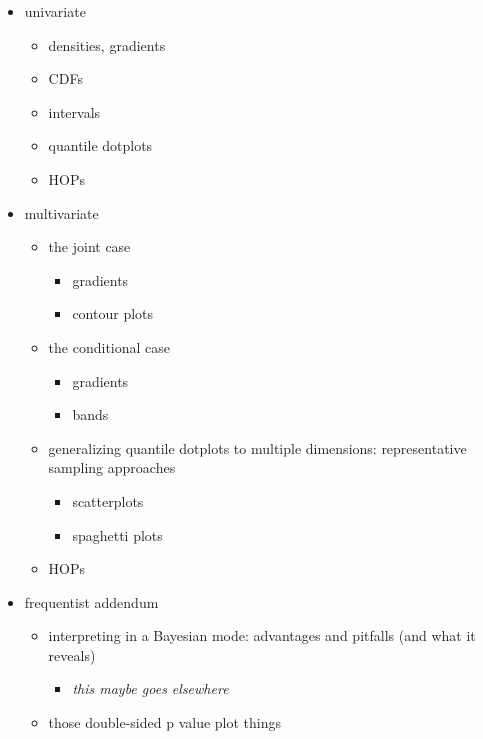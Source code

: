 \documentclass[]{book}
\providecommand{\tightlist}{%
  \setlength{\itemsep}{0pt}\setlength{\parskip}{0pt}}
\theoremstyle{definition}
\theoremstyle{definition}
\theoremstyle{definition}
\theoremstyle{remark}
\begin{document}
\begin{itemize}
\tightlist
\item
  univariate

  \begin{itemize}
  \tightlist
  \item
    densities, gradients
  \item
    CDFs
  \item
    intervals
  \item
    quantile dotplots
  \item
    HOPs
  \end{itemize}
\item
  multivariate

  \begin{itemize}
  \tightlist
  \item
    the joint case

    \begin{itemize}
    \tightlist
    \item
      gradients
    \item
      contour plots
    \end{itemize}
  \item
    the conditional case

    \begin{itemize}
    \tightlist
    \item
      gradients
    \item
      bands
    \end{itemize}
  \item
    generalizing quantile dotplots to multiple dimensions:
    representative sampling approaches

    \begin{itemize}
    \tightlist
    \item
      scatterplots
    \item
      spaghetti plots
    \end{itemize}
  \item
    HOPs
  \end{itemize}
\item
  frequentist addendum

  \begin{itemize}
  \tightlist
  \item
    interpreting in a Bayesian mode: advantages and pitfalls (and what
    it reveals)

    \begin{itemize}
    \tightlist
    \item
      \emph{this maybe goes elsewhere}
    \end{itemize}
  \item
    those double-sided p value plot things
  \end{itemize}
\end{itemize}
\end{document}
